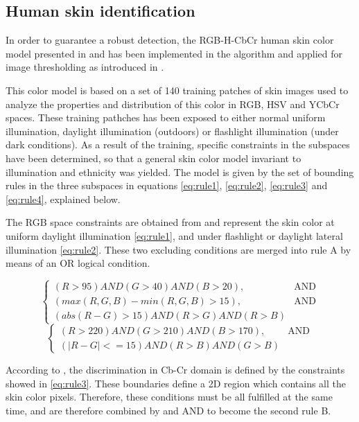 \subsection{Human skin identification}
In order to guarantee a robust detection, the RGB-H-CbCr human skin color model presented in \cite{Ref:SkinColorModel} and \cite{Ref:SkinDetection} has been implemented in the algorithm and applied for image thresholding as introduced in \cite{Ref:SkinDetection}. 

This color model is based on a set of 140 training patches of skin images used to analyze the properties and
distribution of this color in RGB, HSV and YCbCr spaces.  These training pathches has been exposed to either normal uniform illumination, daylight illumination (outdoors) or flashlight illumination (under dark conditions). 
As a result of the training, specific constraints in the subspaces have been determined, so that a general skin color model invariant to illumination and ethnicity was yielded. 
The model is given by the set of bounding rules in the three subspaces in equations \ref{eq:rule1}, \ref{eq:rule2}, \ref{eq:rule3} and \ref{eq:rule4}, explained below.

The RGB space constraints are obtained from \cite{Ref:SkinColorModel} and represent the skin color at uniform daylight illumination \ref{eq:rule1}, and under flashlight or daylight lateral illumination \ref{eq:rule2}. These two excluding conditions are merged into rule A by means of an OR logical condition.

\begin{equation}
		\begin{cases}
		    (R > 95) AND (G > 40) AND (B > 20),& \text{AND}\\
		    (max(R, G, B) - min(R, G, B) > 15), & \text{AND}\\
		    (abs(R - G) > 15) AND (R > G) AND (R > B)
		\end{cases}
		\label{eq:rule1}
\end{equation}
\begin{equation}
		\begin{cases}
		    (R > 220) AND (G > 210) AND (B > 170),& \text{AND}\\
			(|R - G| <= 15) AND (R > B) AND (G > B)
		\end{cases}
	\label{eq:rule2}
\end{equation}

According to \cite{Ref:SkinDetection}, the discrimination in Cb-Cr domain is defined by the constraints showed in \ref{eq:rule3}.  
These boundaries define a 2D region which contains all the skin color pixels. 
Therefore, these conditions must be all fulfilled at the same time, and are therefore combined by and AND to become the second rule B.

